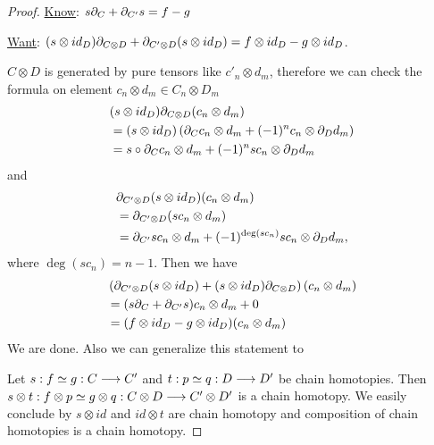 \documentclass[11pt]{book} %
\begin{document}
\begin{proof}
\underline{Know}: $ s{\partial}_{C}+{\partial}_{C'} s=f-g$

\underline{Want}: $(s\otimes id_D){\partial}_{C\otimes D} +{\partial}_{C'\otimes D} (s\otimes id_D)=f\otimes id_D-g\otimes id_D$. 

$C\otimes D$ is generated by pure tensors like $c'_n\otimes d_m$, therefore we can  check the formula on element $c_n\otimes d_m\in C_n\otimes D_m$
$$
\begin{aligned}
&(s\otimes id_D){\partial}_{C\otimes D}(c_n\otimes d_m)\\
&=(s\otimes id_D)\left({\partial}_C c_n\otimes d_m +(-1)^n c_n\otimes{\partial}_D d_m\right)\\
&=s\circ {\partial}_C c_n\otimes d_m+(-1)^n s c_n\otimes {\partial}_D d_m
\end{aligned}
$$
and
$$
\begin{aligned}
&{\partial}_{C'\otimes D} (s\otimes id_D)(c_n\otimes d_m)\\
&={\partial}_{C'\otimes D} (s c_n\otimes d_m)\\
&= {\partial}_{C'} s c_n \otimes d_m+(-1)^{\deg(sc_n)}sc_n\otimes {\partial}_D d_m,
\end{aligned}
$$
where $\deg (sc_n)=n-1$. Then we have
$$
\begin{aligned}
&\left({\partial}_{C'\otimes D} (s\otimes id_D)+(s\otimes id_D){\partial}_{C\otimes D}\right) (c_n\otimes d_m)\\
&=(s{\partial}_C+{\partial}_{C'} s)c_n \otimes d_m+0\\
&=(f\otimes id_D-g\otimes id_D)(c_n\otimes d_m)
\end{aligned}
$$
We are done. Also we can generalize this statement to 

 Let $s:  f \simeq g: C\longrightarrow C'$ and  $t:  p \simeq q: D\longrightarrow D'$ be chain homotopies. Then $s\otimes t :f\otimes p  \simeq g \otimes q : C\otimes D \longrightarrow C' \otimes D'$ is a chain homotopy. We easily conclude by $s\otimes id$ and $id\otimes t$ are chain homotopy and composition of chain homotopies is a chain homotopy.
\end{proof}
\end{document}

